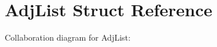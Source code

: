 \hypertarget{struct_adj_list}{}\section{Adj\+List Struct Reference}
\label{struct_adj_list}


Collaboration diagram for Adj\+List\+:
